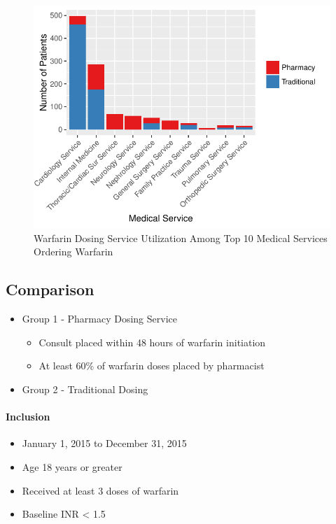 \documentclass[]{article}
\providecommand{\tightlist}{%
  \setlength{\itemsep}{0pt}\setlength{\parskip}{0pt}}
\let\oldparagraph\paragraph
\renewcommand{\paragraph}[1]{\oldparagraph{#1}\mbox{}}
\begin{document}
\begin{figure}[H]
\centering
\includegraphics{warfarin_analysis_ASHP_files/figure-latex/ds_med_service_curr-1.pdf}
\caption{Warfarin Dosing Service Utilization Among Top 10 Medical
Services Ordering Warfarin}
\end{figure}

\subsection{Comparison}\label{comparison}

\begin{itemize}
\tightlist
\item
  Group 1 - Pharmacy Dosing Service

  \begin{itemize}
  \tightlist
  \item
    Consult placed within 48 hours of warfarin initiation
  \item
    At least 60\% of warfarin doses placed by pharmacist
  \end{itemize}
\item
  Group 2 - Traditional Dosing
\end{itemize}

\paragraph{Inclusion}\label{inclusion}

\begin{itemize}
\tightlist
\item
  January 1, 2015 to December 31, 2015
\item
  Age 18 years or greater
\item
  Received at least 3 doses of warfarin
\item
  Baseline INR \textless{} 1.5
\end{itemize}
\end{document}
